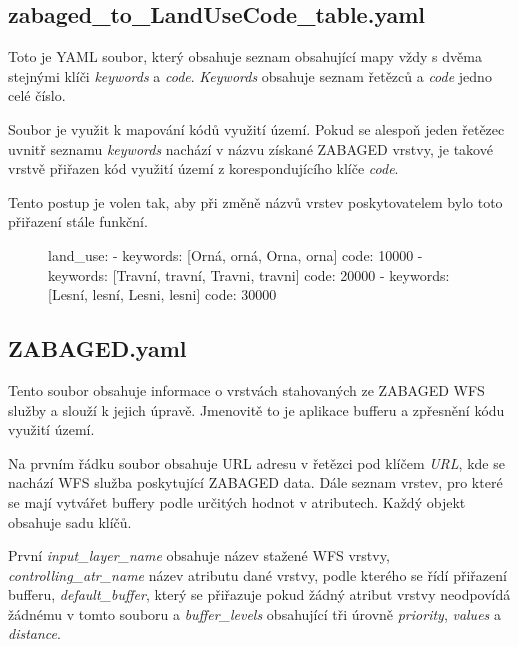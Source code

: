 \documentclass[a4paper,oneside,12pt]{book}
\begin{document}
\subsection*{zabaged\_to\_LandUseCode\_table.yaml} \label{zabaged_to_LandUseCode_table.yaml}
\hspace{10mm}Toto je YAML soubor, který obsahuje seznam obsahující mapy vždy s dvěma stejnými klíči \textit{keywords} a \textit{code}. \textit{Keywords} obsahuje seznam řetězců a \textit{code} jedno celé číslo.

\hspace{10mm}Soubor je využit k mapování kódů využití území. Pokud se alespoň jeden řetězec uvnitř seznamu \textit{keywords} nachází v názvu získané ZABAGED vrstvy, je takové vrstvě přiřazen kód využití území z korespondujícího klíče \textit{code}.

\hspace{10mm}Tento postup je volen tak, aby při změně názvů vrstev poskytovatelem bylo toto přiřazení stále funkční.

\begin{figure}[H]
\begin{pythoncode}[style=myyaml, caption={Ukázka zabaged\_to\_LandUseCode\_table.yaml},label={kod:zabaged_to_LandUseCode_table.yaml}]
land_use:
  - keywords: [Orná, orná, Orna, orna]
    code: 10000
  - keywords: [Travní, travní, Travni, travni]
    code: 20000
  - keywords: [Lesní, lesní, Lesni, lesni]
    code: 30000
\end{pythoncode}
\end{figure}

\subsection*{ZABAGED.yaml} \label{ZABAGED.yaml}
\hspace{10mm} Tento soubor obsahuje informace o vrstvách stahovaných ze ZABAGED WFS služby a slouží k jejich úpravě. Jmenovitě to je aplikace bufferu a zpřesnění kódu využití území.

\hspace{10mm}Na prvním řádku soubor obsahuje URL adresu v řetězci pod klíčem \textit{URL}, kde se nachází WFS služba poskytující ZABAGED data. Dále seznam vrstev, pro které se mají vytvářet buffery podle určitých hodnot v atributech. Každý objekt obsahuje sadu klíčů.

\hspace{10mm}První \textit{input\_layer\_name} obsahuje název stažené WFS vrstvy, \newline \textit{controlling\_atr\_name} název atributu dané vrstvy, podle kterého se řídí přiřazení bufferu, \textit{default\_buffer}, který se přiřazuje pokud žádný atribut vrstvy neodpovídá žádnému v tomto souboru a \textit{buffer\_levels} obsahující tři úrovně \textit{priority}, \textit{values} a \textit{distance}.
\end{document}

